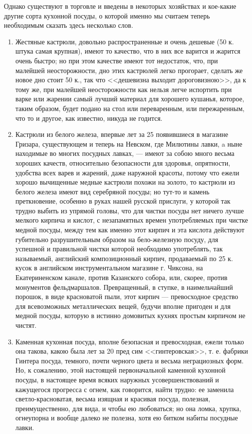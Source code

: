 Однако существуют в торговле и введены в некоторых хозяйствах и кое-какие другие сорта кухонной посуды, о которой именно мы считаем теперь необходимым сказать здесь несколько слов.

\begin{enumerate}
	\item Жестяные кастрюли, довольно распространенные и очень дешевые (50 к. штука самая крупная), имеют то качество, что в них все варится и жарится очень быстро; но при этом качестве имеют тот недостаток, что, при малейшей неосторожности, дно этих кастрюлей легко прогорает, сделать же новое дно стоит 50 к., так что <<дешевизна выходит дороговизною>>, да к тому же, при малейшей неосторожности как нельзя легче испортить при варке или жарении самый лучший материал для хорошего кушанья, которое, таким образом, будет подано на стол или переваренным, или пережаренным, что то и другое, как известно, никуда не годится.
	\item Кастрюли из белого железа, впервые лет за 25 появившиеся в магазине Гризара, существующем и теперь на Невском, где Милютины лавки, a ныне находимые во многих посудных лавках, — имеют за собою много весьма хороших качеств, относительно безопасности для здоровья, опрятности, удобства всех варев и жарений, даже наружной красоты, потому что ежели хорошо вычищенные медные кастрюли похожи на золото, то кастрюли из белого железа имеют вид серебряной посуды; но тут-то и камень преткновение, особенно в руках нашей русской прислуги, у которой так трудно выбить из упрямой головы, что для чистки посуды нет ничего лучше мелкого кирпича и кислот, с незапамятных времен употребляемых при чистке медной посуды, между тем как именно этот кирпич и эта кислота действуют губительно разрушительным образом на бело-железную посуду, для успешной и правильной чистки которой необходимо употреблять, так называемый, английский композиционный кирпич, продаваемый по 25 к. кусок в английском инструментальном магазине г. Чиксона, на Екатериненском канале, против Казанского собора, или, скорее, против монументов фельдмаршалов. Превращенный, в ступке, в наимельчайший порошок, в виде красноватой пыли, этот кирпич — превосходное средство для всевозможных металлических вещей, будучи вполне пригоден и для медной посуды, которую в истинно домовитых кухнях простым кирпичом не чистят.
	\item Каменная кухонная посуда, вполне безопасная и превосходная, ежели только она такова, какою была лет за 20 пред сим <<гинтеровская>>, т. е. фабрики Гинтера посуда, темного, почти черного цвета и весьма неграциозных форм. Но, к сожалению, этой настоящей первоначальной каменной кухонной посуды, в настоящее время всяких наружных усовершенствований и кажущегося прогресса с огнем, как говорится, найти трудно: ее заменила светло-красноватая, весьма изящная и красивая посуда, полезная, преимущественно, для вида, и чтобы ею любоваться; но она ломка, хрупка, огнеупорна и вообще далеко не полезна, хотя ею битком набиты посудные лавки.
\end{enumerate}

